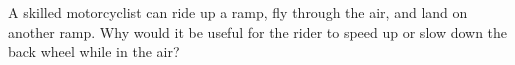 A skilled motorcyclist can ride up a ramp, fly through the air, and land on another ramp.
Why would it be useful for the rider to speed up or slow down the back wheel while in the air?
